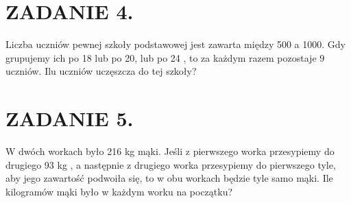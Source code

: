 \documentclass[10pt]{article}
\begin{document}
\section*{ZADANIE 4.}
Liczba uczniów pewnej szkoły podstawowej jest zawarta między 500 a 1000. Gdy grupujemy ich po 18 lub po 20, lub po 24 , to za każdym razem pozostaje 9 uczniów. Ilu uczniów uczęszcza do tej szkoły?

\section*{ZADANIE 5.}
W dwóch workach było 216 kg mąki. Jeśli z pierwszego worka przesypiemy do drugiego 93 kg , a następnie z drugiego worka przesypiemy do pierwszego tyle, aby jego zawartość podwoiła się, to w obu workach będzie tyle samo mąki. Ile kilogramów mąki było w każdym worku na początku?
\end{document}
